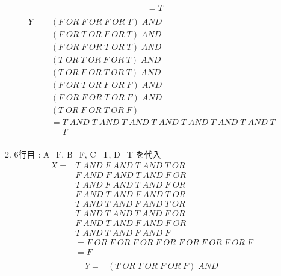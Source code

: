 \documentclass[dvipdfmx,10pt, a4j]{jarticle}
\theoremstyle{definition}
\begin{document}
\begin{enumerate}[i)]
\begin{enumerate}[1)]
\begin{align*}
                &= T\\
            \end{align*}
            \begin{align*}
                Y = & (F\; OR\; F\; OR\; F\; OR\; T) \; AND\\
                & (F\; OR\; T\; OR\; F\; OR\; T)\; AND\\
                & (F\; OR\; F\; OR\; T\; OR\; T)\; AND\\
                & (T\; OR\; T\; OR\; F\; OR\; T)\; AND\\
                & (T\; OR\; F\; OR\; T\; OR\; T)\; AND\\
                & (F\; OR\; T\; OR\; F\; OR\; F)\; AND\\
                & (F\; OR\; F\; OR\; T\; OR\; F)\; AND\\
                & (T\; OR\; F\; OR\; T\; OR\; F)\\
                &= T\; AND\; T\; AND\; T\; AND\; T\; AND\; T\; AND\; T\; AND\; T\; AND\; T\\
                &= T\\
            \end{align*}
            \item 6行目 : A=F, B=F, C=T, D=T を代入\\
            \begin{align*}
                X = &T\; AND\; F\; AND\; T\; AND\; T\; OR\\
                &F\; AND\; F\; AND\; T\; AND\; F\; OR\\
                &T\; AND\; F\; AND\; T\; AND\; F\; OR\\
                &F\; AND\; T\; AND\; F\; AND\; T\; OR\\
                &T\; AND\; T\; AND\; F\; AND\; T\; OR\\
                &T\; AND\; T\; AND\; T\; AND\; F\; OR\\
                &F\; AND\; T\; AND\; F\; AND\; F\; OR\\
                &T\; AND\; T\; AND\; F\; AND\; F\\
                &= F\; OR\; F\; OR\; F\; OR\; F\; OR\; F\; OR\; F\; OR\; F\; OR\; F\\
                &= F\\
            \end{align*}
            \begin{align*}
                Y = & (T\; OR\; T\; OR\; F\; OR\; F) \; AND\\

\end{align*}
\end{enumerate}
\end{enumerate}
\end{document}
